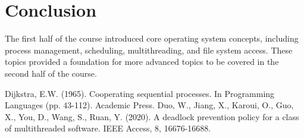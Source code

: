 \documentclass[12pt]{article}
\begin{document}
\section{Conclusion}
The first half of the course introduced core operating system concepts,
including process management, scheduling, multithreading, and file system
access. These topics provided a foundation for more advanced topics to be
covered in the second half of the course.

\begin{thebibliography}{9}
     Dijkstra, E.W. (1965). Cooperating sequential processes. In Programming Languages (pp. 43-112). Academic Press.
    Duo, W., Jiang, X., Karoui, O., Guo, X., You, D., Wang, S., Ruan, Y. (2020). A deadlock prevention policy for a class of multithreaded software. IEEE Access, 8, 16676-16688.
\end{thebibliography}
\end{document}
